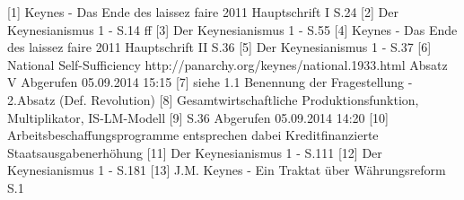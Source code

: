 \documentclass[
      onecolumn,
      a4paper,
      abstracton,
      parskip=half
      ,final
      ]{scrartcl}
\begin{document}
[1] Keynes - Das Ende des laissez faire 2011 Hauptschrift I S.24
[2] Der Keynesianismus 1 - S.14 ff
[3] Der Keynesianismus 1 - S.55
[4] Keynes - Das Ende des laissez faire 2011 Hauptschrift II S.36
[5] Der Keynesianismus 1 - S.37
[6] National Self-Sufficiency http://panarchy.org/keynes/national.1933.html
	Absatz V Abgerufen 05.09.2014 15:15
[7] siehe 1.1 Benennung der Fragestellung - 2.Absatz (Def. Revolution)
[8] Gesamtwirtschaftliche Produktionsfunktion, Multiplikator, IS-LM-Modell
[9] %
	S.36 Abgerufen 05.09.2014 14:20
[10] Arbeitsbeschaffungsprogramme entsprechen dabei Kreditfinanzierte Staatsausgabenerh{\"o}hung
[11] Der Keynesianismus 1 - S.111
[12] Der Keynesianismus 1 - S.181
[13] J.M. Keynes - Ein Traktat {\"u}ber W{\"a}hrungsreform S.1
\end{document}
